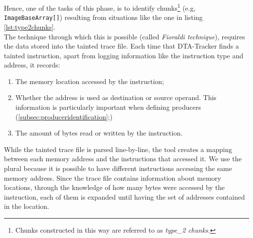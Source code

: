 \documentclass[LaM,binding=0.6cm]{sapthesis}
\begin{document}
Hence, one of the tasks of this phase, is to identify chunks\footnote{Chunks constructed in this way are referred to as \textit{type\_2 chunks}.} (e.g, \texttt{ImageBaseArray[]}) resulting from situations like the one in listing \ref{lst:type2chunks}.\\
The technique through which this is possible (called \textit{Fioraldi technique}), requires the data stored into the tainted trace file. Each time that DTA-Tracker finds a tainted instruction, apart from logging information like the instruction type and address, it records:
\begin{enumerate}
\item The memory location accessed by the instruction;
\item Whether the address is used as destination or source operand. This information is particularly important when defining producers (\autoref{subsec:produceridentification};)
\item The amount of bytes read or written by the instruction.
\end{enumerate}
While the tainted trace file is parsed line-by-line, the tool creates a mapping between each memory address and the instructions that accessed it. We use the plural because it is possible to have different instructions accessing the same memory address. Since the trace file contains information about memory locations, through the knowledge of how many bytes were accessed by the instruction, each of them is expanded until having the set of addresses contained in the location.\\
\end{document}
